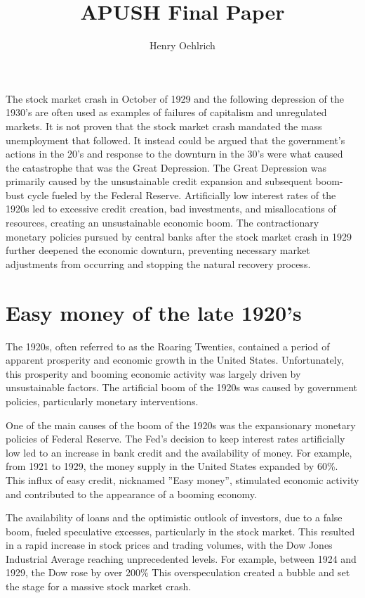 \documentclass{article}
\title{APUSH Final Paper}
\author{Henry Oehlrich}
\begin{document}
\maketitle{}

The stock market crash in October of 1929 and the following depression of the
1930’s are often used as examples of failures of capitalism and unregulated
markets. It is not proven that the stock market crash mandated the mass
unemployment that followed. It instead could be argued that the government’s
actions in the 20’s and response to the downturn in the 30’s were what caused
the catastrophe that was the Great Depression. The Great Depression was
primarily caused by the unsustainable credit expansion and subsequent boom-bust
cycle fueled by the Federal Reserve. Artificially low interest rates of the
1920s led to excessive credit creation, bad investments, and misallocations of
resources, creating an unsustainable economic boom. The contractionary
monetary policies pursued by central banks after the stock market crash in 1929
further deepened the economic downturn, preventing necessary market adjustments
from occurring and stopping the natural recovery process.

\section{Easy money of the late 1920's}

The 1920s, often referred to as the Roaring Twenties, contained a period of
apparent prosperity and economic growth in the United States. Unfortunately,
this prosperity and booming economic activity was largely driven by
unsustainable factors. The artificial boom of the 1920s was caused by
government policies, particularly monetary interventions.

One of the main causes of the boom of the 1920s was the expansionary monetary
policies of Federal Reserve. The Fed’s decision to keep interest rates
artificially low led to an increase in bank credit and the availability of
money. For example, from 1921 to 1929, the money supply in the United States
expanded by 60\%. This influx of easy credit, nicknamed ”Easy money”,
stimulated economic activity and contributed to the appearance of a booming
economy.

The availability of loans and the optimistic outlook of investors, due to a
false boom, fueled speculative excesses, particularly in the stock market. This
resulted in a rapid increase in stock prices and trading volumes, with the Dow
Jones Industrial Average reaching unprecedented levels. For example, between
1924 and 1929, the Dow rose by over 200\% This overspeculation created a bubble
and set the stage for a massive stock market crash.
\end{document}
